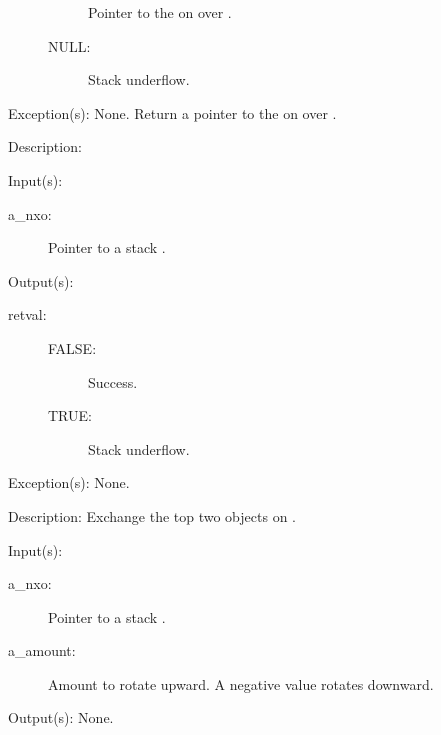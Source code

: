 \begin{capi}
\begin{capilist}
\begin{description}
\begin{description}
				Pointer to the  on  over
				.
			\item[NULL: ]
				Stack underflow.
			\end{description}
		\end{description}
	\item[Exception(s): ] None.
		Return a pointer to the  on  over
		.
	\item[Description: ]
	\end{capilist}
\label{nxo_stack_exch}
	\begin{capilist}
	\item[Input(s): ]
		\begin{description}\item[]
		\item[a\_nxo: ]
			Pointer to a stack .
		\end{description}
	\item[Output(s): ]
		\begin{description}\item[]
		\item[retval: ]
			\begin{description}\item[]
			\item[FALSE: ]
				Success.
			\item[TRUE: ]
				Stack underflow.
			\end{description}
		\end{description}
	\item[Exception(s): ] None.
	\item[Description: ]
		Exchange the top two objects on .
	\end{capilist}
\label{nxo_stack_rot}
	\begin{capilist}
	\item[Input(s): ]
		\begin{description}\item[]
		\item[a\_nxo: ]
			Pointer to a stack \classname{nxo}.
		\item[a\_amount: ]
			Amount to rotate upward.  A negative value rotates
			downward.
		\end{description}
	\item[Output(s): ] None.

\end{capilist}
\end{capi}
